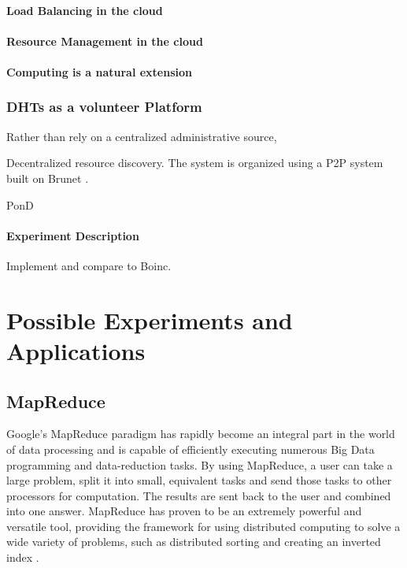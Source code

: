 \documentclass[10pt,letterpaper]{report}
\begin{document}
\subsubsection{Load Balancing in the cloud}
\subsubsection{Resource Management in the cloud}
\subsubsection{Computing is a natural extension}

\subsection{DHTs as a volunteer Platform}
Rather than rely on a centralized administrative source,


Decentralized resource discovery.
The system is organized using a P2P system built on Brunet \cite{brunet}.



PonD \cite{leepond}
\subsubsection{Experiment Description}
Implement and compare to Boinc.



\chapter{Possible Experiments and Applications}


\section{MapReduce}

Google's MapReduce \cite{mapreduce} paradigm has rapidly become an integral part in the world of data processing and is capable of efficiently executing numerous Big Data programming and data-reduction tasks.  
By using MapReduce, a user can take a large problem, split it into small, equivalent tasks and send those tasks to other processors for computation.  
The results are sent back to the user and combined into one answer.  
MapReduce has proven to be an extremely powerful and versatile tool, providing the framework for using distributed computing to solve a wide variety of problems, such as distributed sorting and creating an inverted index \cite{mapreduce}. 
\end{document}
